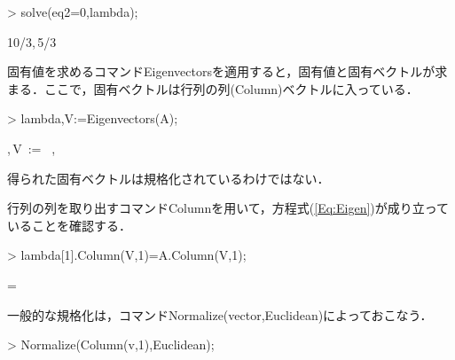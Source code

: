\begin{MapleInput}
> solve(eq2=0,lambda);
\end{MapleInput}
\begin{MapleOutput}
10/3,\,5/3
\end{MapleOutput}

固有値を求めるコマンドEigenvectorsを適用すると，固有値と固有ベクトルが求まる．ここで，固有ベクトルは行列の列(Column)ベクトルに入っている．
\begin{MapleInput}
> lambda,V:=Eigenvectors(A);
\end{MapleInput}
\begin{MapleOutput}
\lambda,\,V\, := \, \left[ \begin {array}{c} 10/3\\5/3\end {array} \right] ,\, \left[ \begin {array}{cc} 2&-1/2\\1&1\end {array} \right] 
\end{MapleOutput}
得られた固有ベクトルは規格化されているわけではない．

行列の列を取り出すコマンドColumnを用いて，方程式(\ref{Eq:Eigen})が成り立っていることを確認する．
\begin{MapleInput}
> lambda[1].Column(V,1)=A.Column(V,1);
\end{MapleInput}
\begin{MapleOutput}
\displaystyle
\left[ \begin {array}{c} 20/3\\
10/3\end {array} \right] = 
\left[ \begin {array}{c} 20/3\\
10/3\end {array} \right] 
\end{MapleOutput}
一般的な規格化は，コマンドNormalize(vector,Euclidean)によっておこなう．
\begin{MapleInput}
> Normalize(Column(v,1),Euclidean);
\end{MapleInput}

